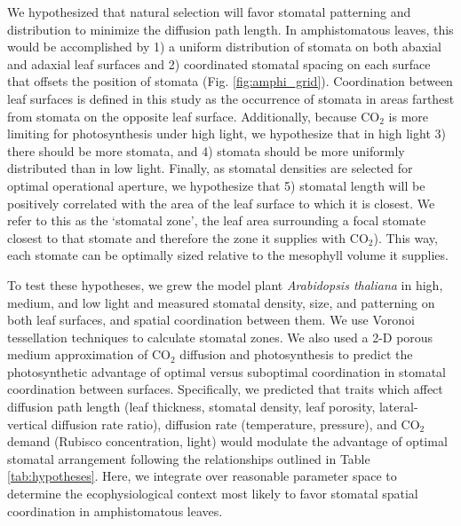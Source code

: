 \documentclass[12pt,halfline,a4paper,]{ouparticle}
\begin{document}
We hypothesized that natural selection will favor stomatal patterning
and distribution to minimize the diffusion path length. In
amphistomatous leaves, this would be accomplished by 1) a uniform
distribution of stomata on both abaxial and adaxial leaf surfaces and 2)
coordinated stomatal spacing on each surface that offsets the position
of stomata (Fig. \ref{fig:amphi_grid}). Coordination between leaf
surfaces is defined in this study as the occurrence of stomata in areas
farthest from stomata on the opposite leaf surface. Additionally,
because CO\(_2\) is more limiting for photosynthesis under high light,
we hypothesize that in high light 3) there should be more stomata, and
4) stomata should be more uniformly distributed than in low light.
Finally, as stomatal densities are selected for optimal operational
aperture, we hypothesize that 5) stomatal length will be positively
correlated with the area of the leaf surface to which it is closest. We
refer to this as the `stomatal zone', the leaf area surrounding a focal
stomate closest to that stomate and therefore the zone it supplies with
CO\(_2\)). This way, each stomate can be optimally sized relative to the
mesophyll volume it supplies.

To test these hypotheses, we grew the model plant \emph{Arabidopsis
thaliana} in high, medium, and low light and measured stomatal density,
size, and patterning on both leaf surfaces, and spatial coordination
between them. We use Voronoi tessellation techniques to calculate
stomatal zones. We also used a 2-D porous medium approximation of
CO\(_2\) diffusion and photosynthesis to predict the photosynthetic
advantage of optimal versus suboptimal coordination in stomatal
coordination between surfaces. Specifically, we predicted that traits
which affect diffusion path length (leaf thickness, stomatal density,
leaf porosity, lateral-vertical diffusion rate ratio), diffusion rate
(temperature, pressure), and CO\(_2\) demand (Rubisco concentration,
light) would modulate the advantage of optimal stomatal arrangement
following the relationships outlined in Table \ref{tab:hypotheses}.
Here, we integrate over reasonable parameter space to determine the
ecophysiological context most likely to favor stomatal spatial
coordination in amphistomatous leaves.
\end{document}

